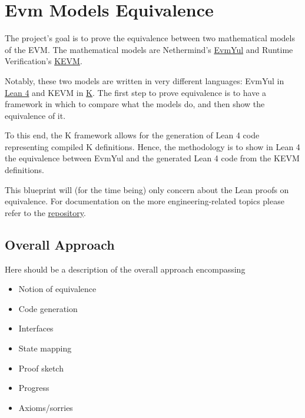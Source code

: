 \chapter*{Evm Models Equivalence}\label{evm-equiv-intro}

The project's goal is to prove the equivalence between two mathematical models of the EVM.
The mathematical models are Nethermind's \href{https://github.com/nethermindEth/EVMYulLean/}{EvmYul}
and Runtime Verification's \href{https://github.com/runtimeverification/evm-semantics}{KEVM}.

Notably, these two models are written in very different languages: EvmYul in
\href{https://lean-lang.org}{Lean 4} and KEVM in \href{https://kframework.org}{K}.
The first step to prove equivalence is to have a framework in which to compare
what the models do, and then show the equivalence of it.

To this end, the K framework allows for the generation of Lean 4 code
representing compiled K definitions.
Hence, the methodology is to show in Lean 4 the equivalence between EvmYul and
the generated Lean 4 code from the KEVM definitions.

This blueprint will (for the time being) only concern about the Lean proofs on
equivalence. For documentation on the more engineering-related topics please
refer to the
\href{https://github.com/runtimeverification/evm-equivalence}{repository}.

\section{Overall Approach}

Here should be a description of the overall approach encompassing
\begin{itemize}
\item Notion of equivalence
\item Code generation
\item Interfaces
\item State mapping
\item Proof sketch
\item Progress
\item Axioms/sorries
\end{itemize}

